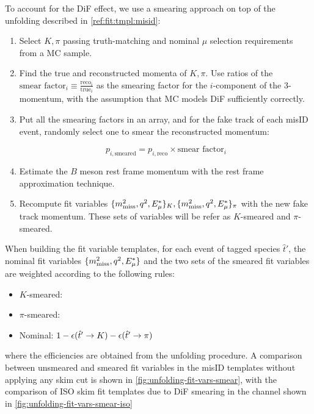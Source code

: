 To account for the DiF effect, we use a smearing approach on top of the
unfolding described in \cref{ref:fit:tmpl:misid}:

\begin{enumerate}
    \item Select $K, \pi$ passing truth-matching and nominal $\mu$ selection
        requirements from a MC sample.

    \item Find the true and reconstructed momenta of
        $K, \pi$.
        Use ratios of the
        $\text{smear factor}_i \equiv \frac{\text{reco}_i}{\text{true}_i}$
        as the smearing factor for the $i$-component of the 3-momentum,
        with the assumption that MC models DiF sufficiently correctly.

    \item Put all the smearing factors in an array,
        and for the fake \muon track of each misID event,
        randomly select one to smear the reconstructed momentum:

        \begin{equation}
            p_{i,\text{smeared}} =
                p_{i,\text{reco}} \times \text{smear factor}_i
        \end{equation}

    \item Estimate the $B$ meson rest frame momentum with the rest frame
        approximation technique. %
    \item Recompute fit variables
        $\{\mmSq, \qSq, \el\}_K, \{\mmSq, \qSq, \el\}_\pi$
        with the new fake \muon track momentum.
        These sets of variables will be refer as $K$-smeared and $\pi$-smeared.
\end{enumerate}

When building the fit variable templates, for each event of tagged species
$\hat{t}'$,
the nominal fit variables $\{\mmSq, \qSq, \el\}$ and the two sets of the smeared
fit variables are weighted according to the following rules:

\begin{itemize}
    \item $K$-smeared: 
    \item $\pi$-smeared: \misEff[\hat{t}']{\pi}
    \item Nominal: $1 - \misEff[\hat{t}']{K} - \misEff[\hat{t}']{\pi}$
\end{itemize}
where the efficiencies are obtained from the unfolding procedure.
A comparison between unsmeared and smeared fit variables in the misID templates
without applying any skim cut is shown in \cref{fig:unfolding-fit-vars-smear},
with the comparison of ISO skim fit templates due to DiF smearing in the \Dz
channel shown in \cref{fig:unfolding-fit-vars-smear-iso}

